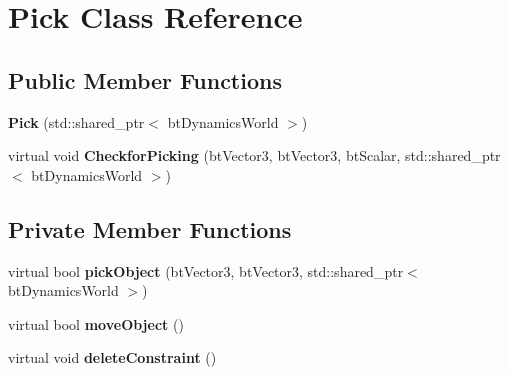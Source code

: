 \hypertarget{class_pick}{}\section{Pick Class Reference}
\label{class_pick}
\subsection*{Public Member Functions}
\begin{DoxyCompactItemize}
\item 
{\bfseries Pick} (std\+::shared\+\_\+ptr$<$ bt\+Dynamics\+World $>$)\hypertarget{class_pick_ac3f2224d9365fabf66a1b508374ed204}{}\label{class_pick_ac3f2224d9365fabf66a1b508374ed204}

\item 
virtual void {\bfseries Checkfor\+Picking} (bt\+Vector3, bt\+Vector3, bt\+Scalar, std\+::shared\+\_\+ptr$<$ bt\+Dynamics\+World $>$)\hypertarget{class_pick_af7768e601142bf6e563b1d42e9947180}{}\label{class_pick_af7768e601142bf6e563b1d42e9947180}

\end{DoxyCompactItemize}
\subsection*{Private Member Functions}
\begin{DoxyCompactItemize}
\item 
virtual bool {\bfseries pick\+Object} (bt\+Vector3, bt\+Vector3, std\+::shared\+\_\+ptr$<$ bt\+Dynamics\+World $>$)\hypertarget{class_pick_a35669d6fa238f14bf0693d871d5c4a70}{}\label{class_pick_a35669d6fa238f14bf0693d871d5c4a70}

\item 
virtual bool {\bfseries move\+Object} ()\hypertarget{class_pick_a6ffb2557dd445c501646143213b909c4}{}\label{class_pick_a6ffb2557dd445c501646143213b909c4}

\item 
virtual void {\bfseries delete\+Constraint} ()\hypertarget{class_pick_adecf66aec823723b2e7e08c110704ad0}{}\label{class_pick_adecf66aec823723b2e7e08c110704ad0}

\end{DoxyCompactItemize}
